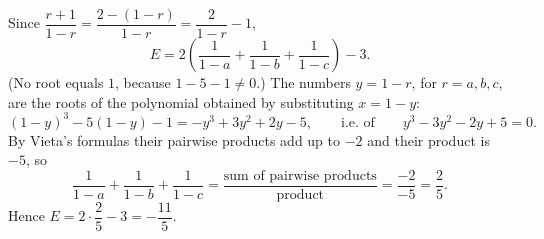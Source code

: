 Since $\dfrac{r+1}{1-r}=\dfrac{2-(1-r)}{1-r}=\dfrac{2}{1-r}-1$,
\[E=2\left(\dfrac1{1-a}+\dfrac1{1-b}+\dfrac1{1-c}\right)-3.\]
(No root equals $1$, because $1-5-1\ne0$.) The numbers $y=1-r$, for $r=a,b,c$, are the roots of the polynomial obtained by substituting $x=1-y$:
\[(1-y)^3-5(1-y)-1=-y^3+3y^2+2y-5,\qquad\text{i.e. of}\qquad y^3-3y^2-2y+5=0.\]
By Vieta's formulas their pairwise products add up to $-2$ and their product is $-5$, so
\[\dfrac1{1-a}+\dfrac1{1-b}+\dfrac1{1-c}=\dfrac{\text{sum of pairwise products}}{\text{product}}=\dfrac{-2}{-5}=\dfrac25.\]
Hence $E=2\cdot\dfrac25-3=\boxed{-\dfrac{11}{5}}$.
